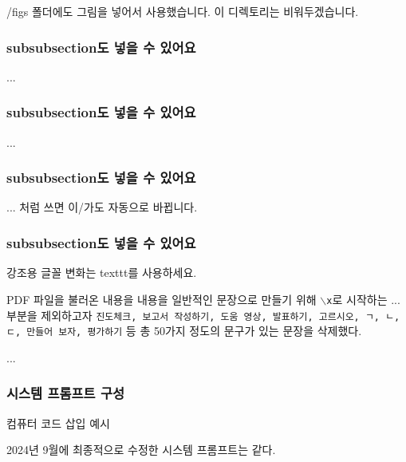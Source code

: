/figs 폴더에도 그림을 넣어서 사용했습니다. 이 디렉토리는 비워두겠습니다.

\subsubsection{subsubsection도 넣을 수 있어요}

...

\subsubsection{subsubsection도 넣을 수 있어요}

...

\subsubsection{subsubsection도 넣을 수 있어요}

\cite{min2024}\가 ... 처럼 쓰면 이/가도 자동으로 바뀝니다.

\subsubsection{subsubsection도 넣을 수 있어요}

강조용 글꼴 변화는 texttt를 사용하세요.

PDF 파일을 불러온 내용을 내용을 일반적인 문장으로 만들기 위해 \texttt{$\backslash$x}로 시작하는 ... 부분을 제외하고자 \texttt{진도체크, 보고서 작성하기, 도움 영상, 발표하기, 고르시오, ㄱ, ㄴ, ㄷ, 만들어 보자, 평가하기} 등 총 50가지 정도의 문구가 있는 문장을 삭제했다.

...

\subsubsection{시스템 프롬프트 구성}

컴퓨터 코드 삽입 예시

2024년 9월에 최종적으로 수정한 시스템 프롬프트는 \와 같다.

